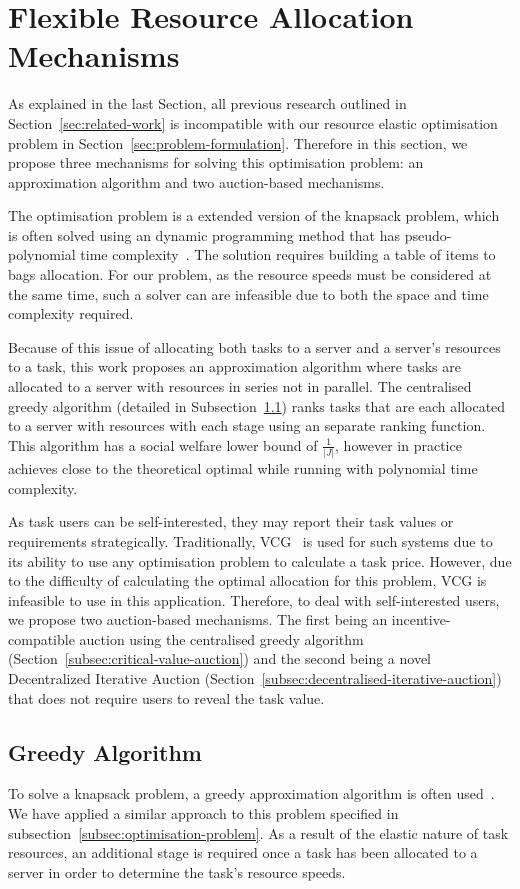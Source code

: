 \section{Flexible Resource Allocation Mechanisms}
\label{sec:flexible-resource-allocation-mechanisms}
As explained in the last Section, all previous research outlined in Section~\ref{sec:related-work} is incompatible
with our resource elastic optimisation problem in Section~\ref{sec:problem-formulation}. Therefore in this
section, we propose three mechanisms for solving this optimisation problem: an approximation algorithm and two
auction-based mechanisms.

The optimisation problem is a extended version of the knapsack problem, which is often solved using an dynamic
programming method that has pseudo-polynomial time complexity~\cite{}. The solution requires building a table of items to bags
allocation. For our problem, as the resource speeds must be considered at the same time, such a solver can are
infeasible due to both the space and time complexity required.

Because of this issue of allocating both tasks to a server and a server's resources to a task, this work proposes an
approximation algorithm where tasks are allocated to a server with resources in series not in parallel. The centralised
greedy algorithm (detailed in Subsection~\ref{subsec:greedy-algorithm}) ranks tasks that are each allocated to a server
with resources with each stage using an separate ranking function. This algorithm has a social welfare lower bound
of $\frac{1}{\left|J\right|}$, however in practice achieves close to the theoretical optimal while running with
polynomial time complexity.

As task users can be self-interested, they may report their task values or requirements strategically. Traditionally,
VCG~\cite{vickrey,Clarke,groves} is used for such systems due to its ability to use any optimisation problem to
calculate a task price. However, due to the difficulty of calculating the optimal allocation for this problem, VCG is
infeasible to use in this application. Therefore, to deal with self-interested users, we propose two auction-based
mechanisms. The first being an incentive-compatible auction using the centralised greedy algorithm
(Section~\ref{subsec:critical-value-auction}) and the second being a novel Decentralized Iterative
Auction (Section~\ref{subsec:decentralised-iterative-auction}) that does not require users to reveal the task value.

\subsection{Greedy Algorithm}
\label{subsec:greedy-algorithm}
To solve a knapsack problem, a greedy approximation algorithm is often used~\cite{}. We have applied a similar approach
to this problem specified in subsection~\ref{subsec:optimisation-problem}. As a result of the elastic nature of task
resources, an additional stage is required once a task has been allocated to a server in order to determine the task's
resource speeds.

